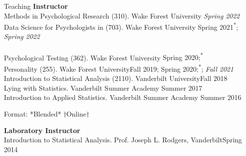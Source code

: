 \begin{rSection}{\textrm{Teaching}}
\vspace*{2pt}
{\large  \bf Instructor}\\
Methods in Psychological Research (310). Wake Forest University \hfill {\textit{Spring 2022}}\smallskip\\%
%
Data Science for Psychologists in \R (703). Wake Forest University \hfill{Spring 2021\textsuperscript{*}; \textit{Spring 2022}}\\
\hspace* {6 mm}\smallskip\\%
%
Psychological Testing (362). Wake Forest University \hfill{Spring 2020;\textsuperscript{*}}
\hspace* {6 mm} \smallskip\\%
%
Personality (255). Wake Forest University\hfill{Fall 2019; Spring 2020;\textsuperscript{*}; \textit{Fall 2021}}\smallskip\\%
%
Introduction to Statistical Analysis (2110). Vanderbilt University\hfill {Fall 2018}\smallskip\\%
%
Lying with Statistics. Vanderbilt Summer Academy \hfill{Summer 2017}\smallskip\\%
%
Introduction to Applied Statistics. Vanderbilt Summer Academy \hfill{Summer 2016}%
\vspace{-2mm}\begin{center}\footnotesize{Format: *Blended* $\dagger$Online$\dagger$}\end{center}%
\begin{minipage}{\linewidth}
{\large {\bf Laboratory Instructor}}\\
Introduction to Statistical Analysis. Prof. Joseph L. Rodgers, Vanderbilt\hfill{Spring 2014}%

\end{minipage}
\end{rSection}
